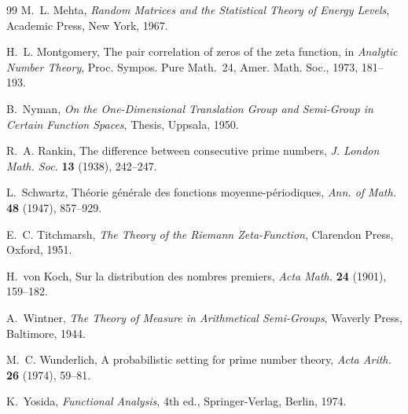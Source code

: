 \documentclass[12pt,letterpaper]{article}
\theoremstyle{definition}
\theoremstyle{remark}
\begin{document}
\begin{thebibliography}{99}
 M.~L. Mehta, \emph{Random Matrices and the Statistical
Theory of Energy Levels}, Academic Press, New York, 1967.

 H.~L. Montgomery, The pair correlation of zeros of
the zeta function, in \emph{Analytic Number Theory}, Proc. Sympos. Pure
Math.~24, Amer. Math. Soc., 1973, 181--193.

 B.~Nyman, \emph{On the One-Dimensional Translation Group
and Semi-Group in Certain Function Spaces}, Thesis, Uppsala, 1950.

 R.~A. Rankin, The difference between consecutive prime
numbers, \emph{J. London Math. Soc.} \textbf{13} (1938), 242--247.

 L.~Schwartz, Th\'eorie g\'en\'erale des fonctions
moyenne-p\'eriodiques, \emph{Ann. of Math.} \textbf{48} (1947), 857--929.

 E.~C. Titchmarsh, \emph{The Theory of the Riemann
Zeta-Function}, Clarendon Press, Oxford, 1951.

 H.~von Koch, Sur la distribution des nombres premiers,
\emph{Acta Math.} \textbf{24} (1901), 159--182.

 A.~Wintner, \emph{The Theory of Measure in Arithmetical
Semi-Groups}, Waverly Press, Baltimore, 1944.

 M.~C. Wunderlich, A probabilistic setting for prime
number theory, \emph{Acta Arith.} \textbf{26} (1974), 59--81.

 K.~Yosida, \emph{Functional Analysis}, 4th ed.,
Springer-Verlag, Berlin, 1974.

\end{thebibliography}
\end{document}
